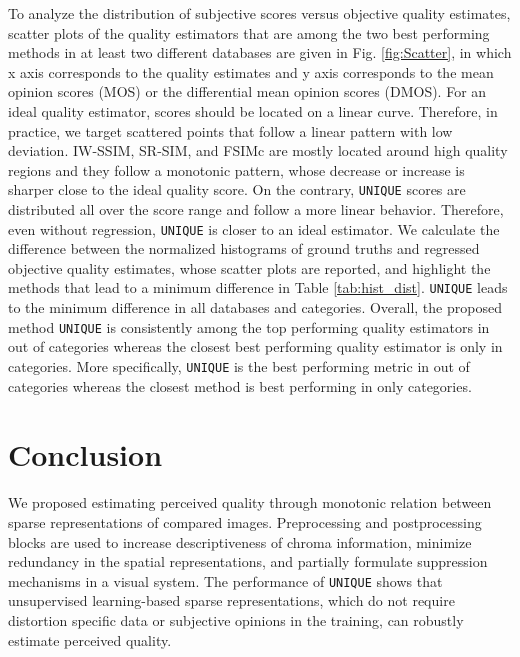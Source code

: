 \documentclass[draftcls,12pt, onecolumn]{IEEEtran}
\begin{document}
\vspace{-2.0mm}


To analyze the distribution of subjective scores versus objective quality estimates, scatter plots of the quality estimators that are among the two best performing methods in at least two different databases are given in Fig. \ref{fig:Scatter}, in which x axis corresponds to the quality estimates and y axis corresponds to the mean opinion scores (MOS) or the differential mean opinion scores (DMOS). For an ideal quality estimator, scores should be located on a linear curve. Therefore, in practice, we target scattered points that follow a linear pattern with low deviation. IW-SSIM, SR-SIM, and FSIMc are mostly located around high quality regions and they follow a monotonic pattern, whose decrease or increase is sharper close to the ideal quality score. On the contrary, \texttt{UNIQUE} scores are distributed all over the score range and follow a more linear behavior. Therefore, even without regression, \texttt{UNIQUE} is closer to an ideal estimator. We calculate the difference between the normalized histograms of ground truths and regressed objective quality estimates, whose scatter plots are reported, and highlight the methods that lead to a minimum difference in Table \ref{tab:hist_dist}. \texttt{UNIQUE} leads to the minimum difference in all databases and categories. Overall, the proposed method \texttt{UNIQUE} is consistently among the top performing quality estimators in  out of  categories whereas the closest best performing quality estimator is only in  categories. More specifically, \texttt{UNIQUE} is the best performing metric in  out of  categories whereas the closest method is best performing in only  categories.


 

\vspace{-2.0mm}


\section{Conclusion}
We proposed estimating perceived quality through monotonic relation between sparse representations of compared images. Preprocessing and postprocessing blocks are used to increase descriptiveness of chroma information, minimize redundancy in the spatial representations, and partially formulate suppression mechanisms in a visual system. The performance of \texttt{UNIQUE} shows that unsupervised learning-based sparse representations, which do not require distortion specific data or subjective opinions in the training, can robustly estimate perceived quality.  
\end{document}
